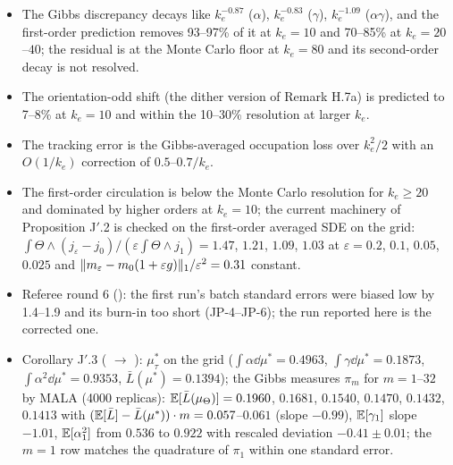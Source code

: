 \begin{itemize}
  \item The Gibbs discrepancy decays like $k_e^{-0.87}$ ($\alpha$), $k_e^{-0.83}$ ($\gamma$), $k_e^{-1.09}$
    ($\alpha\gamma$), and the first-order prediction removes 93--97\% of it at $k_e=10$ and 70--85\% at
    $k_e=20$--$40$; the residual is at the Monte Carlo floor at $k_e=80$ and its second-order decay is not resolved.
  \item The orientation-odd shift (the dither version of Remark H.7a) is predicted to 7--8\% at $k_e=10$ and within
    the 10--30\% resolution at larger $k_e$.
  \item The tracking error is the Gibbs-averaged occupation loss over $k_e^2/2$ with an $O(1/k_e)$ correction of
    $0.5$--$0.7/k_e$.
  \item The first-order circulation is below the Monte Carlo resolution for $k_e\ge20$ and dominated by higher orders
    at $k_e=10$; the current machinery of Proposition J$'$.2 is checked on the first-order averaged SDE on the grid:
    $\int\Theta\wedge(j_\varepsilon-j_0)/(\varepsilon\int\Theta\wedge j_1)=1.47$, $1.21$, $1.09$, $1.03$ at
    $\varepsilon=0.2$, $0.1$, $0.05$, $0.025$ and $\lVert m_\varepsilon-m_0(1+\varepsilon g)\rVert_1/\varepsilon^2=0.31$
    constant.
  \item Referee round 6 (): the first run's batch standard errors were biased
    low by 1.4--1.9 and its burn-in too short (JP-4--JP-6); the run reported here is the corrected one.
  \item Corollary J$'$.3 ( $\to$ ): $\mu^*_\tau$ on the grid
    ($\int\alpha\dd\mu^*=0.4963$, $\int\gamma\dd\mu^*=0.1873$, $\int\alpha^2\dd\mu^*=0.9353$,
    $\bar L(\mu^*)=0.1394$); the Gibbs measures $\pi_m$ for $m=1$--$32$ by MALA (4000 replicas):
    $\mathbb{E}[\bar L(\mu_\Theta)]=0.1960$, $0.1681$, $0.1540$, $0.1470$, $0.1432$, $0.1413$ with
    $(\mathbb{E}[\bar L]-\bar L(\mu^*))\cdot m=0.057$--$0.061$ (slope $-0.99$), $\mathbb{E}[\gamma_1]$ slope $-1.01$,
    $\mathbb{E}[\alpha_1^2]$ from $0.536$ to $0.922$ with rescaled deviation $-0.41\pm0.01$; the $m=1$ row matches the
    quadrature of $\pi_1$ within one standard error.
\end{itemize}

